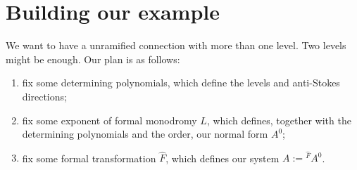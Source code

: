 \section{Building our example}
We want to have a unramified connection with more than one level. Two levels
might be enough. Our plan is as follows:
\begin{enumerate}
  \item fix some determining polynomials, which define the levels and
    anti-Stokes directions;
  \item fix some exponent of formal monodromy $L$, which defines, together with
    the determining polynomials and the order, our normal form $A^0$;
  \item fix some formal transformation $\hat F$, which defines our system
    $A:={}^{\hat F}\!A^0$.
\end{enumerate}

